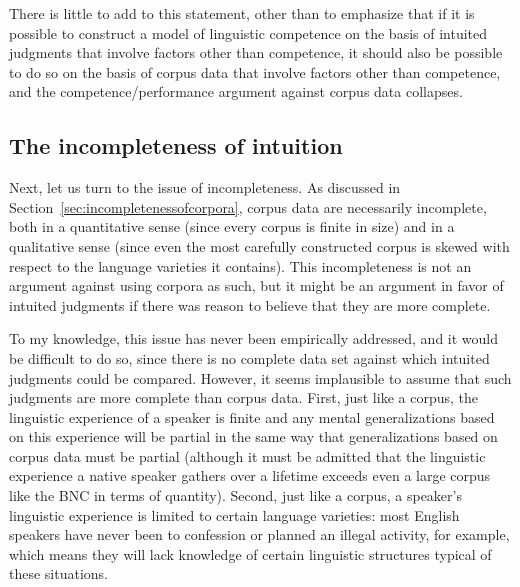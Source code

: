 There is little to add to this statement, other than to emphasize that if it is possible to construct a model of linguistic competence  on the basis of intuited  judgments that involve factors other than competence, it should also be possible to do so on the basis of corpus data that involve factors other than competence, and the competence\slash performance  argument against corpus data collapses.

\subsection{The incompleteness of intuition}
\label{sec:incompletenessofintuition}

Next, let us turn to the issue of incompleteness. As discussed in Section~\ref{sec:incompletenessofcorpora}, corpus data are necessarily incomplete, both in a quantitative sense (since every corpus is finite in size)  and in a qualitative sense (since even the most carefully constructed corpus is skewed with respect to the language varieties  it contains). This incompleteness is not an argument against using corpora as such, but it might be an argument in favor of intuited  judgments if there was reason to believe that they are more complete.

To my knowledge, this issue has never been empirically addressed, and it would be difficult to do so, since there is no complete data set against which intuited  judgments could be compared. However, it seems implausible to assume that such judgments are more complete than corpus data. First, just like a corpus, the linguistic experience of a speaker is finite and any mental generalizations based on this experience will be partial in the same way that generalizations based on corpus data must be partial (although it must be admitted that the linguistic experience a native speaker gathers over a lifetime exceeds even a large  corpus like the BNC  in terms of quantity). Second, just like a corpus, a speaker's linguistic experience is limited to certain language varieties:  most English speakers have never been to confession or planned an illegal activity, for example, which means they will lack knowledge of certain linguistic structures typical of these situations.

